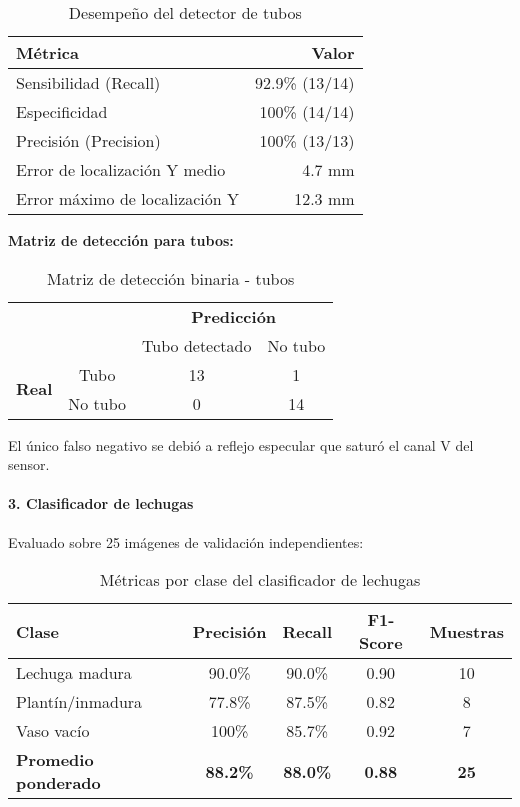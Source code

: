 \begin{enumerate}
\begin{table}[H]
\centering
\begin{tabular}{|l|r|}
\hline
\textbf{Métrica} & \textbf{Valor} \\ \hline
Sensibilidad (Recall) & 92.9\% (13/14) \\ \hline
Especificidad & 100\% (14/14) \\ \hline
Precisión (Precision) & 100\% (13/13) \\ \hline
Error de localización Y medio & 4.7 mm \\ \hline
Error máximo de localización Y & 12.3 mm \\ \hline
\end{tabular}
\caption{Desempeño del detector de tubos}
\label{tab:metricas_tubos}
\end{table}

\textbf{Matriz de detección para tubos:}

\begin{table}[H]
\centering
\begin{tabular}{cc|c|c|}
\cline{3-4}
& & \multicolumn{2}{c|}{\textbf{Predicción}} \\ \cline{3-4}
& & Tubo detectado & No tubo \\ \hline
\multicolumn{1}{|c|}{\multirow{2}{*}{\textbf{Real}}} & Tubo & 13 & 1 \\ \cline{2-4}
\multicolumn{1}{|c|}{} & No tubo & 0 & 14 \\ \hline
\end{tabular}
\caption{Matriz de detección binaria - tubos}
\label{tab:confusion_tubos}
\end{table}

\noindent
El único falso negativo se debió a reflejo especular que saturó el canal V del sensor.

\paragraph{3. Clasificador de lechugas}
Evaluado sobre 25 imágenes de validación independientes:

\begin{table}[H]
\centering
\begin{tabular}{|l|c|c|c|c|}
\hline
\textbf{Clase} & \textbf{Precisión} & \textbf{Recall} & \textbf{F1-Score} & \textbf{Muestras} \\ \hline
Lechuga madura & 90.0\% & 90.0\% & 0.90 & 10 \\ \hline
Plantín/inmadura & 77.8\% & 87.5\% & 0.82 & 8 \\ \hline
Vaso vacío & 100\% & 85.7\% & 0.92 & 7 \\ \hline
\textbf{Promedio ponderado} & \textbf{88.2\%} & \textbf{88.0\%} & \textbf{0.88} & \textbf{25} \\ \hline
\end{tabular}
\caption{Métricas por clase del clasificador de lechugas}
\label{tab:metricas_lechugas}
\end{table}


\end{enumerate}
